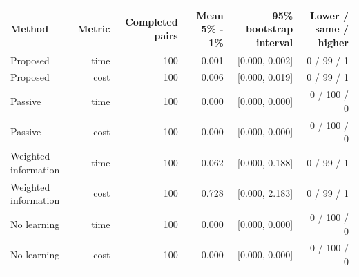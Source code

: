 \begin{tabular}{lrrrrr}
\toprule
Method & Metric & Completed pairs & Mean 5\% - 1\% & 95\% bootstrap interval & Lower / same / higher \\
\midrule
Proposed & time & 100 & 0.001 & [0.000, 0.002] & 0 / 99 / 1 \\
Proposed & cost & 100 & 0.006 & [0.000, 0.019] & 0 / 99 / 1 \\
Passive & time & 100 & 0.000 & [0.000, 0.000] & 0 / 100 / 0 \\
Passive & cost & 100 & 0.000 & [0.000, 0.000] & 0 / 100 / 0 \\
Weighted information & time & 100 & 0.062 & [0.000, 0.188] & 0 / 99 / 1 \\
Weighted information & cost & 100 & 0.728 & [0.000, 2.183] & 0 / 99 / 1 \\
No learning & time & 100 & 0.000 & [0.000, 0.000] & 0 / 100 / 0 \\
No learning & cost & 100 & 0.000 & [0.000, 0.000] & 0 / 100 / 0 \\
\bottomrule
\end{tabular}
